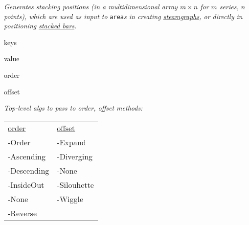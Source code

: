 




\textit{Generates stacking positions (in a multidimensional array $m\times n$ for $m$ series, $n$ points), which are used as input to }\texttt{area}\textit{s in creating \href{https://observablehq.com/@mbostock/streamgraph-transitions}{steamgraphs}, or directly in positioning \href{https://observablehq.com/@d3/stacked-bar-chart}{stacked bars}.}

\begin{tinylist}{3}
    \item keys
    \item value
    \item order
    \item offset
\end{tinylist}

\textit{Top-level algs to pass to order, offset methods:}
\begin{tabular}{l l}
    \underline{order} & \underline{offset} \\
    -Order & -Expand \\
    -Ascending & -Diverging \\
    -Descending & -None \\
    -InsideOut & -Silouhette \\
    -None & -Wiggle \\
    -Reverse & \\
\end{tabular}
